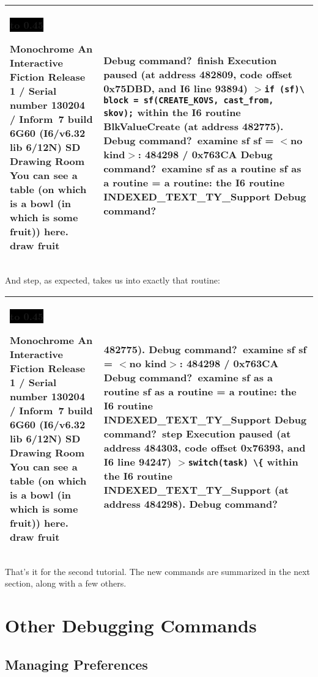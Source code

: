 \documentclass{book}
\newcommand{\lastpagebreak}{\vfill\pagebreak}
\newcommand{\n}{\hspace*{\fill}\newline}
\newcommand{\terp}[2]{\begin{center}\begin{tabular}{p{0.45\textwidth}|p{0.45\textwidth}}\midrule #1&#2\\\midrule\end{tabular}\end{center}}
\newcommand{\glkheading}[1]{\textbf{#1}}
\newcommand{\glkinput}[1]{\textbf{#1}}
\newcommand{\glkstatusline}[2]{\centerline{\colorbox{black}{\hbox to 0.45\textwidth{\textcolor{white}{#1\hfil #2}}}}}
\newcommand{\storyprompt}{\raisebox{1.5pt}{\(>\)}}
\newcommand{\cursor}{\raisebox{-1.5pt}{\RectangleThin}}
\newcommand{\markedindent}{\(>\)\qquad}
\begin{document}
\terp{\glkstatusline{Drawing Room}{0/1}\n
  \glkheading{Monochrome}\n
  An Interactive Fiction\n
  Release 1 / Serial number 130204 / Inform~7 build 6G60 (I6/v6.32 lib 6/12N) SD\n
  \n
  \glkheading{Drawing Room}\n
  You can see a table (on which is a bowl (in which is some fruit)) here.\n
  \n
  \storyprompt\glkinput{draw fruit}}{%
  \n
  Debug command?\ \glkinput{finish}\n
  \n
  Execution paused (at address 482809, code offset 0x75DBD, and I6 line 93894)\n
  \markedindent \lstinline{if (sf)}\lstinline{\ block = sf(CREATE_KOVS, cast_from, skov);}\n
  within the I6 routine BlkValueCreate (at address 482775).\n
  \n
  Debug command?\ \glkinput{examine sf}\n
  \n
  sf = \(<\)no kind\(>\): 484298 / 0x763CA\n
  \n
  Debug command?\ \glkinput{examine sf as a routine}\n
  \n
  sf as a routine = a routine: the I6 routine INDEXED\_TEXT\_TY\_Support\n
  \n
  Debug command?\ \cursor}

And step, as expected, takes us into exactly that routine:

\terp{\glkstatusline{Drawing Room}{0/1}\n
  \glkheading{Monochrome}\n
  An Interactive Fiction\n
  Release 1 / Serial number 130204 / Inform~7 build 6G60 (I6/v6.32 lib 6/12N) SD\n
  \n
  \glkheading{Drawing Room}\n
  You can see a table (on which is a bowl (in which is some fruit)) here.\n
  \n
  \storyprompt\glkinput{draw fruit}}{%
  482775).\n
  \n
  Debug command?\ \glkinput{examine sf}\n
  \n
  sf = \(<\)no kind\(>\): 484298 / 0x763CA\n
  \n
  Debug command?\ \glkinput{examine sf as a routine}\n
  \n
  sf as a routine = a routine: the I6 routine INDEXED\_TEXT\_TY\_Support\n
  \n
  Debug command?\ \glkinput{step}\n
  \n
  Execution paused (at address 484303, code offset 0x76393, and I6 line 94247)\n
  \markedindent \lstinline @switch(task) \{@\n
  within the I6 routine INDEXED\_TEXT\_TY\_Support (at address 484298).\n
  \n
  Debug command?\ \cursor}

That's it for the second tutorial.  The new commands are summarized in the next
section, along with a few others.

\lastpagebreak

\section{Other Debugging Commands}
\label{other}

\subsection{Managing Preferences}
\end{document}
